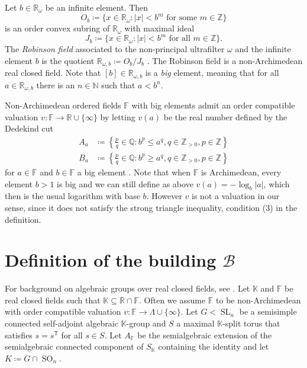 \documentclass[12pt]{amsart}
\newcommand{\F}{\mathbb{F} }
\newcommand{\R}{\mathbb{R} }
\newcommand{\Q}{\mathbb{Q} }
\newcommand{\N}{\mathbb{N} }
\newcommand{\Z}{\mathbb{Z} }
\newcommand{\K}{\mathbb{K}}
\newcommand{\B}{\mathcal{B}}
\newcommand{\tran}{{^{\mathsf{T}}\!}}
\numberwithin{equation}{section}
\theoremstyle{remark} %
\begin{document}
 Let $b \in \R_{\omega}$ be an infinite element. Then
 $$
 O_b \coloneqq \{ x \in \R_{\omega} \colon |x| < b^m \text{ for some } m \in \Z \}
 $$
 is an order convex subring of $\R_\omega$ with maximal ideal
 $$
 J_b \coloneqq \{ x \in \R_\omega \colon |x| <  b^m \text{ for all } m \in \Z \}.
 $$
 The \emph{Robinson field} associated to the non-principal ultrafilter $\omega$ and the infinite element $b$ is the quotient $\R_{\omega,b} \coloneqq O_b/J_b$ \cite{Rob96}. The Robinson field is a non-Archimedean real closed field. Note that $[b] \in \R_{\omega,b} $ is a \emph{big} element, meaning that for all $a \in \R_{\omega,b}$ there is an $n \in \N$ such that $a < b^n$. 
 
 Non-Archimedean ordered fields $\F$ with big elements admit an order compatible valuation $v \colon \F \to \R \cup \{\infty\}$ by letting $v(a)$ be the real number defined by the Dedekind cut
 \begin{align*}
 	A_a &\coloneqq \left\{ \frac{p}{q} \in \Q \colon b^p  \leq a^q , q \in \Z_{>0}, p \in \Z\right\} \\
 	B_a &\coloneqq \left\{ \frac{p}{q} \in \Q \colon b^p  \geq a^q , q \in \Z_{>0}, p \in \Z\right\} 
 \end{align*} 
 for $a \in \F$ and $b\in \F$ a big element \cite{Bru2}. Note that when $\F$ is Archimedean, every element $b>1$ is big and we can still define as above $v(a) = -\log_b|a|$, which then is the usual logarithm with base $b$. However $v$ is not a valuation in our sense, since it does not satisfy the strong triangle inequality, condition (3) in the definition. 
  
 
 
 
 
 
 
 
 
 


\section{Definition of the building \texorpdfstring{$\B$}{B}}\label{sec:building_def} 
For background on algebraic groups over real closed fields, see \cite{AppAGRCF}. Let $\K$ and $\F$ be real closed fields such that $\K \subseteq \R \cap \F$. Often we assume $\F$ to be non-Archimedean with order compatible valuation $v \colon \F\to \Lambda \cup \{\infty\}$. Let $G<\operatorname{SL}_n$ be a semisimple connected self-adjoint algebraic $\K$-group and $S$ a maximal $\K$-split torus that satisfies $s=s\tran$ for all $s\in S$. Let $A_{\F}$ be the semialgebraic extension of the semialgebraic connected component of $S_{\K}$ containing the identity and let $K\coloneqq G\cap \operatorname{SO}_n$. 
\end{document}
